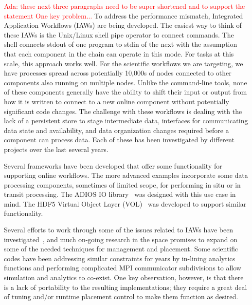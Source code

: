 \documentclass[conference]{IEEEtran}
\newcommand{\ada}[1]{\textcolor{red}{Ada: #1}}
\begin{document}

\ada{these next three paragraphs need to be super shortened and to
  support the statement One key problem... }
To address the performance mismatch, Integrated Application Workflows (IAWs)
are being developed. The easiest way to think of these IAWs is the Unix/Linux
shell pipe operator to connect commands. The shell connects stdout of one
program to stdin of the next with the assumption that each component in the
chain can operate in this mode. For tasks at this scale, this approach works
well. For the scientific workflows we are targeting, we have processes spread
across potentially 10,000s of nodes connected to other components also running
on multiple nodes. Unlike the command-line tools, none of these components
generally have the ability to shift their input or output from how it is
written to connect to a new online component without potentially significant
code changes. The challenge with these workflows is dealing with the lack of a
persistent store to stage intermediate data, interfaces for communicating data
state and availability, and data organization changes required before a
component can process data.  Each of these has been investigated by different
projects over the last several years.

Several frameworks have been developed that offer some functionality for
supporting online workflows. The more advanced examples incorporate some data
processing components, sometimes of limited scope, for performing in situ or in
transit processing. The ADIOS IO library~\cite{lofstead:2009:adaptable} was designed with
this use case in mind. The HDF5 Virtual Object Layer
(VOL)~\cite{chaarawi:2013:hdf5-vol} was developed to support similar
functionality.

Several efforts to work through some of the issues related to IAWs have been
investigated~\cite{karimabadi:2013:catalyst,whitlock:2011:libsim,Glean,dayal:2014:flexpath,dreher:2016:bredala,zheng:2010:predata},
and much on-going research in the space promises to expand on some of the
needed techniques for management and placement.  Some
scientific codes have been addressing similar constraints for years by
in-lining analytics functions and performing complicated MPI communicator
subdivisions to allow simulation and analytics to co-exist.  One key
observation, however, is that there is a lack of portability to the resulting
implementations; they require a great deal of tuning and/or runtime placement
control to make them function as desired.
\fi
\end{document}
